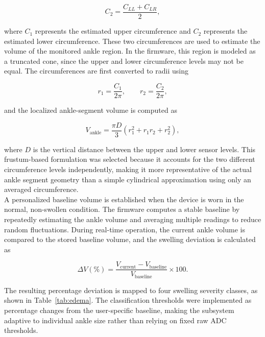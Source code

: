 \begin{equation}
    C_2 = \frac{C_{LL} + C_{LR}}{2},
    \label{eq:lower_circ}
\end{equation}

\noindent where $C_1$ represents the estimated upper circumference and $C_2$ represents the estimated lower circumference. These two circumferences are used to estimate the volume of the monitored ankle region. In the firmware, this region is modeled as a truncated cone, since the upper and lower circumference levels may not be equal. The circumferences are first converted to radii using

\begin{equation}
    r_1 = \frac{C_1}{2\pi},
    \qquad
    r_2 = \frac{C_2}{2\pi},
\end{equation}

\noindent and the localized ankle-segment volume is computed as

\begin{equation}
    V_{\text{ankle}} =
    \frac{\pi D}{3}
    \left(
    r_1^2 + r_1 r_2 + r_2^2
    \right),
    \label{eq:frustum_volume}
\end{equation}

\noindent where $D$ is the vertical distance between the upper and lower sensor levels. This frustum-based formulation was selected because it accounts for the two different circumference levels independently, making it more representative of the actual ankle segment geometry than a simple cylindrical approximation using only an averaged circumference. \\

\noindent A personalized baseline volume is established when the device is worn in the normal, non-swollen condition. The firmware computes a stable baseline by repeatedly estimating the ankle volume and averaging multiple readings to reduce random fluctuations. During real-time operation, the current ankle volume is compared to the stored baseline volume, and the swelling deviation is calculated as

\begin{equation}
    \Delta V(\%) =
    \frac{V_{\text{current}} - V_{\text{baseline}}}
    {V_{\text{baseline}}}
    \times 100.
    \label{eq:volume_deviation}
\end{equation}

\noindent The resulting percentage deviation is mapped to four swelling severity classes, as shown in Table~\ref{tab:edema}. The classification thresholds were implemented as percentage changes from the user-specific baseline, making the subsystem adaptive to individual ankle size rather than relying on fixed raw ADC thresholds.

